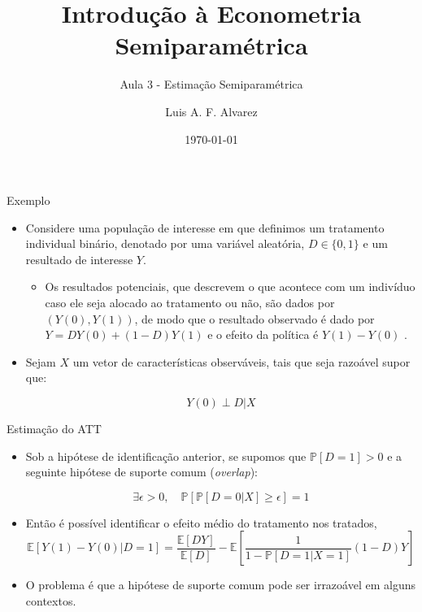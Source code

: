 \documentclass[11pt]{beamer}
\author{Luis A. F. Alvarez}
\title{Introdução à Econometria Semiparamétrica}
\subtitle{Aula 3 - Estimação Semiparamétrica}
\date{\today}
\begin{document}
	\begin{frame}[plain]
	\maketitle
	\end{frame}

	
	\begin{frame}{Exemplo}
		\begin{itemize}
			\item Considere uma população de interesse em que definimos um tratamento individual binário, denotado por uma variável aleatória, $D \in \{0,1\}$ e um resultado de interesse $Y$.
			\begin{itemize}
				\item Os resultados potenciais, que descrevem o que acontece com um indivíduo caso ele seja alocado ao tratamento ou não, são dados por $(Y(0),Y(1))$, de modo que o resultado observado é dado por $Y = DY(0)+(1-D)Y(1)$ e o efeito da política é $Y(1)-Y(0)$ .
			\end{itemize}
			\item Sejam $X$ um vetor de características observáveis, tais que seja razoável supor que:
			
			$$Y(0)\perp D | X$$
		\end{itemize}
	\end{frame}
	\begin{frame}{Estimação do ATT}
		\begin{itemize}
			\item Sob a hipótese de identificação anterior, se supomos que 	$\mathbb{P}[D=1]> 0$ e a seguinte hipótese de suporte comum (\textit{overlap}):
			
			$$\exists \epsilon > 0, \quad \mathbb{P}[\mathbb{P}[D=0|X]\geq \epsilon] = 1 $$
		
			\item Então é possível identificar o efeito médio do tratamento nos tratados, 
			$$\mathbb{E}[Y(1)-Y(0)|D=1] = \frac{\mathbb{E}[DY]}{\mathbb{E}[D]} - \mathbb{E}\left[\frac{1}{1-\mathbb{P}[D=1|X=1]}(1-D)Y\right]$$
			\item O problema é que a hipótese de suporte comum pode ser irrazoável em alguns contextos.
		\end{itemize}
	\end{frame}
	
\end{document}
